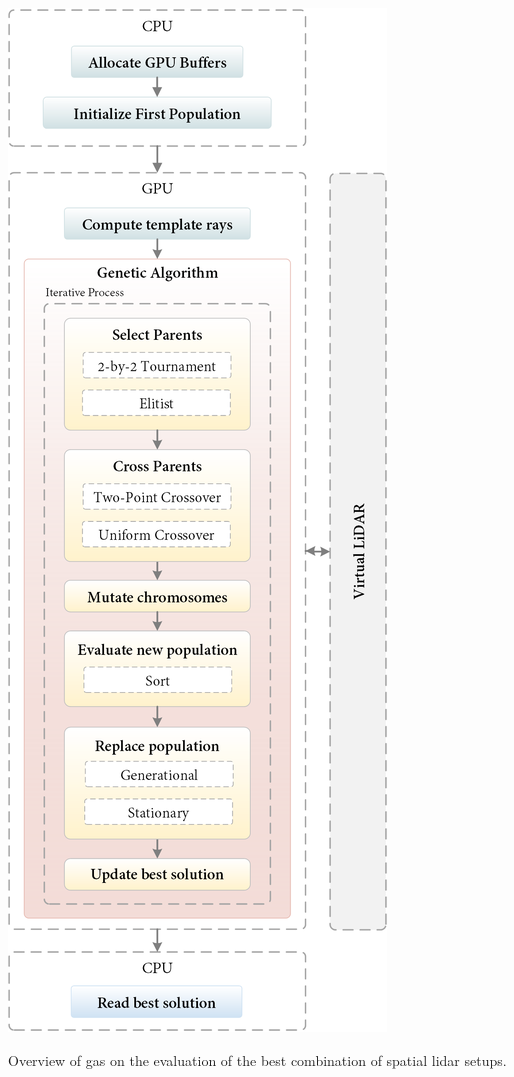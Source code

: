 \begin{marginfigure}[-3.0cm]
    \centering
    \includegraphics[width=\linewidth]{figs/lidar_optimization/genetic_overview.png}
	\caption{Overview of \acrshort{ga}s on the evaluation of the best combination of spatial \acrshort{lidar} setups.}
	\label{fig:genetic_overview}
\end{marginfigure}
